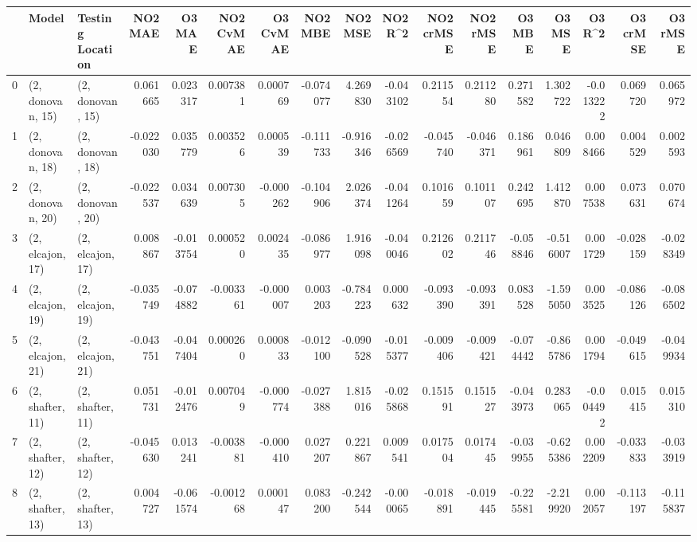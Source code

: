 \begin{tabular}{lllrrrrrrrrrrrrrr}
\toprule
{} &             Model &  Testing Location &   NO2 MAE &    O3 MAE &  NO2 CvMAE &  O3 CvMAE &   NO2 MBE &    NO2 MSE &   NO2 R\textasciicircum2 &  NO2 crMSE &  NO2 rMSE &    O3 MBE &    O3 MSE &    O3 R\textasciicircum2 &  O3 crMSE &   O3 rMSE \\
\midrule
0  &  (2, donovan, 15) &  (2, donovan, 15) &  0.061665 &  0.023317 &   0.007381 &  0.000769 & -0.074077 &   4.269830 & -0.043102 &   0.211554 &  0.211280 &  0.271582 &  1.302722 & -0.013222 &  0.069720 &  0.065972 \\
1  &  (2, donovan, 18) &  (2, donovan, 18) & -0.022030 &  0.035779 &   0.003526 &  0.000539 & -0.111733 &  -0.916346 & -0.026569 &  -0.045740 & -0.046371 &  0.186961 &  0.046809 &  0.008466 &  0.004529 &  0.002593 \\
2  &  (2, donovan, 20) &  (2, donovan, 20) & -0.022537 &  0.034639 &   0.007305 & -0.000262 & -0.104906 &   2.026374 & -0.041264 &   0.101659 &  0.101107 &  0.242695 &  1.412870 &  0.007538 &  0.073631 &  0.070674 \\
3  &  (2, elcajon, 17) &  (2, elcajon, 17) &  0.008867 & -0.013754 &   0.000520 &  0.002435 & -0.086977 &   1.916098 & -0.040046 &   0.212602 &  0.211746 & -0.058846 & -0.516007 &  0.001729 & -0.028159 & -0.028349 \\
4  &  (2, elcajon, 19) &  (2, elcajon, 19) & -0.035749 & -0.074882 &  -0.003361 & -0.000007 &  0.003203 &  -0.784223 &  0.000632 &  -0.093390 & -0.093391 &  0.083528 & -1.595050 &  0.003525 & -0.086126 & -0.086502 \\
5  &  (2, elcajon, 21) &  (2, elcajon, 21) & -0.043751 & -0.047404 &   0.000260 &  0.000833 & -0.012100 &  -0.090528 & -0.015377 &  -0.009406 & -0.009421 & -0.074442 & -0.865786 &  0.001794 & -0.049615 & -0.049934 \\
6  &  (2, shafter, 11) &  (2, shafter, 11) &  0.051731 & -0.012476 &   0.007049 & -0.000774 & -0.027388 &   1.815016 & -0.025868 &   0.151591 &  0.151527 & -0.043973 &  0.283065 & -0.004492 &  0.015415 &  0.015310 \\
7  &  (2, shafter, 12) &  (2, shafter, 12) & -0.045630 &  0.013241 &  -0.003881 & -0.000410 &  0.027207 &   0.221867 &  0.009541 &   0.017504 &  0.017445 & -0.039955 & -0.625386 &  0.002209 & -0.033833 & -0.033919 \\
8  &  (2, shafter, 13) &  (2, shafter, 13) &  0.004727 & -0.061574 &  -0.001268 &  0.000147 &  0.083200 &  -0.242544 & -0.000065 &  -0.018891 & -0.019445 & -0.225581 & -2.219920 &  0.002057 & -0.113197 & -0.115837 \\

\end{tabular}
